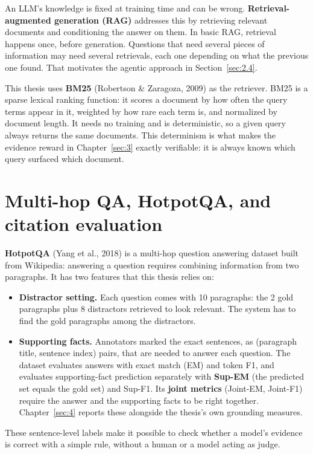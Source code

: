 An LLM's knowledge is fixed at training time and can be wrong.
\textbf{Retrieval-augmented generation (RAG)} addresses this by
retrieving relevant documents and conditioning the answer on them. In
basic RAG, retrieval happens once, before generation. Questions that
need several pieces of information may need several retrievals, each one
depending on what the previous one found. That motivates the agentic
approach in Section~\ref{sec:2.4}.

This thesis uses \textbf{BM25} (Robertson \& Zaragoza, 2009) as the
retriever. BM25 is a sparse lexical ranking function: it scores a
document by how often the query terms appear in it, weighted by how rare
each term is, and normalized by document length. It needs no training
and is deterministic, so a given query always returns the same
documents. This determinism is what makes the evidence reward in
Chapter~\ref{sec:3} exactly verifiable: it is always known which query
surfaced which document.

\section{Multi-hop QA, HotpotQA, and citation evaluation}\label{sec:2.3}

\textbf{HotpotQA} (Yang et al., 2018) is a multi-hop question answering
dataset built from Wikipedia: answering a question requires combining
information from two paragraphs. It has two features that this thesis
relies on:

\begin{itemize}
\tightlist
\item
  \textbf{Distractor setting.} Each question comes with 10 paragraphs:
  the 2 gold paragraphs plus 8 distractors retrieved to look relevant.
  The system has to find the gold paragraphs among the distractors.
\item
  \textbf{Supporting facts.} Annotators marked the exact sentences, as
  (paragraph title, sentence index) pairs, that are needed to answer
  each question. The dataset evaluates answers with exact match (EM) and
  token F1, and evaluates supporting-fact prediction separately with
  \textbf{Sup-EM} (the predicted set equals the gold set) and Sup-F1.
  Its \textbf{joint metrics} (Joint-EM, Joint-F1) require the answer and
  the supporting facts to be right together. Chapter~\ref{sec:4} reports
  these alongside the thesis's own grounding measures.
\end{itemize}

These sentence-level labels make it possible to check whether a model's
evidence is correct with a simple rule, without a human or a model
acting as judge.

